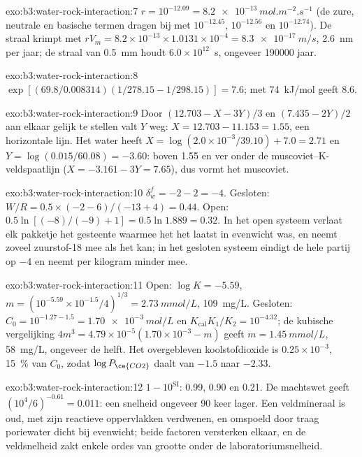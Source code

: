 \begin{solution}{exo:b3:water-rock-interaction:7}
$r = 10^{-12.09} = \qty{8.2e-13}{mol.m^{-2}.s^{-1}}$ (de zure, neutrale en
basische termen dragen bij met $10^{-12.45}$, $10^{-12.56}$ en $10^{-12.74}$). De
straal krimpt met $rV_m = 8.2\times10^{-13}\times1.0131\times10^{-4} =
\qty{8.3e-17}{m/s}$, \qty{2.6}{nm} per jaar; de straal van \qty{0.5}{mm} houdt
$6.0\times10^{12}$~s, ongeveer \num{190000} jaar.
\end{solution}

\begin{solution}{exo:b3:water-rock-interaction:8}
$\exp[(69.8/0.008314)(1/278.15 - 1/298.15)] = 7.6$; met
\qty{74}{kJ/mol} geeft 8.6.
\end{solution}

\begin{solution}{exo:b3:water-rock-interaction:9}
Door $(12.703 - X - 3Y)/3$ en $(7.435 - 2Y)/2$ aan elkaar gelijk te stellen valt $Y$ weg: $X =
12.703 - 11.153 = 1.55$, een horizontale lijn. Het water heeft $X = \log(2.0\times
10^{-3}/39.10) + 7.0 = 2.71$ en $Y = \log(0.015/60.08) = -3.60$: boven 1.55
en ver onder de muscoviet--K-veldspaatlijn ($X = -3.161 - 3Y = 7.65$), dus
vormt het muscoviet.
\end{solution}

\begin{solution}{exo:b3:water-rock-interaction:10}
$\delta_w^f = -2 - 2 = -4$. Gesloten: $W/R = 0.5\times(-2 - 6)/(-13 + 4) =
0.44$. Open: $0.5\ln[(-8)/(-9) + 1] = 0.5\ln1.889 = 0.32$. In het open systeem verlaat elk
pakketje het gesteente waarmee het het laatst in evenwicht was, en neemt zoveel
zuurstof-18 mee als het kan; in het gesloten systeem eindigt de hele partij op $-4$ en
neemt per kilogram minder mee.
\end{solution}

\begin{solution}{exo:b3:water-rock-interaction:11}
Open: $\log K = -5.59$, $m = (10^{-5.59}\times10^{-1.5}/4)^{1/3} =
\qty{2.73}{mmol/L}$, \qty{109}{mg/L}. Gesloten: $C_0 = 10^{-1.27 - 1.5} =
\qty{1.70e-3}{mol/L}$ en $K_{\mathrm{cal}}K_1/K_2 = 10^{-4.32}$; de kubische
vergelijking $4m^3 = 4.79\times10^{-5}(1.70\times10^{-3} - m)$ geeft $m =
\qty{1.45}{mmol/L}$, \qty{58}{mg/L}, ongeveer de helft. Het overgebleven koolstofdioxide is
$0.25\times10^{-3}$, \qty{15}{\percent} van $C_0$, zodat $\log P_{\ce{CO2}}$ daalt
van $-1.5$ naar $-2.33$.
\end{solution}

\begin{solution}{exo:b3:water-rock-interaction:12}
$1 - 10^{\mathrm{SI}}$: 0.99, 0.90 en 0.21. De machtswet geeft
$(10^4/6)^{-0.61} = 0.011$: een snelheid ongeveer 90 keer lager. Een veldmineraal is
oud, met zijn reactieve oppervlakken verdwenen, en omspoeld door traag poriewater dicht bij
evenwicht; beide factoren versterken elkaar, en de veldsnelheid zakt enkele ordes van
grootte onder de laboratoriumsnelheid.
\end{solution}

